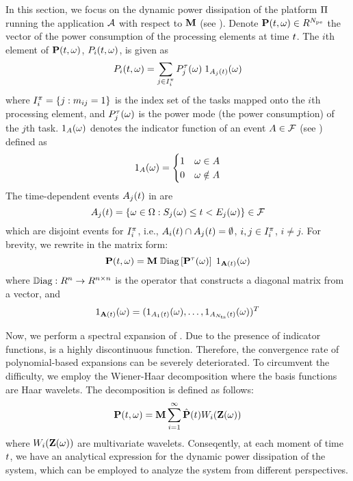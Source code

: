 In this section, we focus on the dynamic power dissipation of the platform $\Pi$ running the application $\mathcal{A}$ with respect to $\mathbf{M}$ (see ). Denote $\mathbf{P}(t, \omega) \in R^{N_\text{pe}}$ the vector of the power consumption of the processing elements at time $t$. The $i$th element of $\mathbf{P}(t, \omega)$, $P_i(t, \omega)$, is given as
\begin{equation} \elabel{processor-power}
  \PP_i(\t, \o) = \sum_{j \in \index^\pi_i} \PT_j(\o) \; \I_{\event_j(\t)}(\o)
\end{equation}
where $I^\pi_i = \{ j: m_{ij} = 1 \}$ is the index set of the tasks mapped onto the $i$th processing element, and $P^\tau_j(\omega)$ is the power mode (the power consumption) of the $j$th task. $1_A(\omega)$ denotes the indicator function of an event $A \in \mathcal{F}$ (see ) defined as
\[
  1_A(\omega) = \begin{cases}
      1 & \omega \in A \\
      0 & \omega \notin A
    \end{cases}
\]
The time-dependent events $A_j(t)$ in  are
\[
  A_j(t) = \{ \omega \in \Omega: S_j(\omega) \leq t < E_j(\omega) \} \in \mathcal{F}
\]
which are disjoint events for $I^\pi_i$, i.e., $A_i(t) \cap A_j(t) = \emptyset$, $i, j \in I^\pi_i$, $i \neq j$. For brevity, we rewrite  in the matrix form:
\begin{equation} \elabel{platform-power}
  \vPP(\t, \o) = \mM \; \oDiag{\vPT(\o)} \; \I_{\m{\event}(\t)}(\o)
\end{equation}
where $\oDiag: \real^n \to \real^{n \times n}$ is the operator that constructs a diagonal matrix from a vector, and
\[
  1_{\mathbf{A}(t)}(\omega) = (1_{A_1(t)}(\omega), \dots, 1_{A_{N_\text{ts}}(t)}(\omega))^T
\]

Now, we perform a spectral expansion of . Due to the presence of indicator functions,  is a highly discontinuous function. Therefore, the convergence rate of polynomial-based expansions can be severely deteriorated. To circumvent the difficulty, we employ the Wiener-Haar decomposition where the basis functions are Haar wavelets. The decomposition is defined as follows:
\[
  \mathbf{P}(t, \omega) = \mathbf{M} \sum_{i = 1}^\infty \hat{\mathbf{P}}(t) W_i(\mathbf{Z}(\omega))
\]
where $W_i(\mathbf{Z}(\omega))$ are multivariate wavelets. Conseqently, at each moment of time $t$, we have an analytical expression for the dynamic power dissipation of the system, which can be employed to analyze the system from different perspectives.
